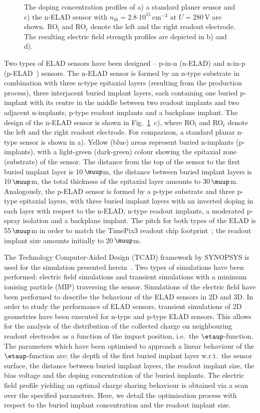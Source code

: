 \documentclass[a4paper,11pt]{article}
\begin{document}
\begin{figure}[t!]
  \hfill 
  \caption{
The doping concentration profiles of a) a standard planer sensor and c) the n-ELAD sensor with $n\mathrm{_{di}} = 2.8\mathrm{\cdot10^{15}\,cm^{-3}}$ at $U=280$\,V are shown. 
RO$_{\textrm{l}}$ and RO$_{\textrm{r}}$ denote the left and the right readout electrode.
The resulting electric field strength profiles are depicted in b) and d).
}
  \label{fig:el}
\end{figure}


Two types of ELAD sensors have been designed -- p-in-n (n-ELAD) and n-in-p (p-ELAD~\cite{elad}) sensors.
The n-ELAD sensor is formed by an n-type substrate in combination with three n-type epitaxial layers (resulting from the production process),
 three interjacent buried implant layers, each containing one buried p-implant with its centre in the middle between two readout implants and two adjacent n-implants,
 p-type readout implants and a backplane implant.
The design of the n-ELAD sensor is shown in Fig.~\ref{fig:el}~c), where RO$_{\textrm{l}}$ and RO$_{\textrm{r}}$ denote the left and the right readout electrode.
For comparison, a standard planar n-type sensor is shown in a).
Yellow (blue) areas represent buried n-implants (p-implants), with a light-green (dark-green) colour showing the epitaxial zone (substrate) of the sensor. 
The distance from the top of the sensor to the first buried implant layer is 10\,$\muup$m, the distance between buried implant layers is 10\,$\muup$m, the total thickness of the epitaxial layer amounts to 30\,$\muup$m.
Analogously, the p-ELAD sensor is formed by a p-type substrate and three p-type epitaxial layers,
 with three buried implant layers with an inverted doping in each layer with respect to the n-ELAD,
 n-type readout implants, a moderated p-spray isolation and a backplane implant.
The pitch for both types of the ELAD is 55\,$\muup$m in order to match the TimePix3 readout chip footprint~\cite{tp3}; the readout implant size amounts initially to 20\,$\muup$m.

The Technology Computer-Aided Design (TCAD) framework by SYNOPSYS is used for the simulation presented herein~\cite{syn}.
Two types of simulations have been performed: electric field simulations and transient simulations with a minimum ionising particle (MIP) traversing the sensor.
Simulations of the electric field have been performed to describe the behaviour of the ELAD sensors in 2D and 3D.
In order to study the performance of ELAD sensors, transient simulations of 2D geometries have been executed for n-type and p-type ELAD sensors.
This allows for the analysis of the distribution of the collected charge on neighbouring readout electrodes as a function of the impact position, i.e.\ the $\etaup$-function.
The parameters which have been optimised to approach a linear behaviour of the $\etaup$-function are: the depth of the first buried implant layer w.r.t.\ the sensor surface, the distance between buried implant layers,
 the readout implant size, the bias voltage and the doping concentration of the buried implants. 
The electric field profile yielding an optimal charge sharing behaviour is obtained via a scan over the specified parameters.
Here, we detail the optimisation process with respect to the buried implant concentration and the readout implant size.
\end{document}

